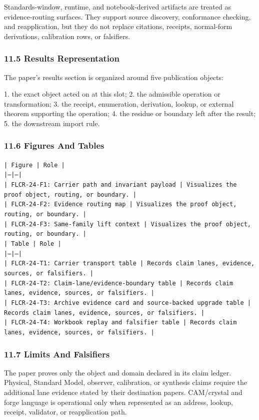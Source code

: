 \documentclass[11pt]{article}
\begin{document}
Standards-window, runtime, and notebook-derived artifacts are treated
as evidence-routing surfaces. They support source discovery, conformance
checking, and reapplication, but they do not replace citations, receipts,
normal-form derivations, calibration rows, or falsifiers.

\subsubsection*{11.5 Results Representation}

The paper's results section is organized around five publication objects:

1. the exact object acted on at this slot;
2. the admissible operation or transformation;
3. the receipt, enumeration, derivation, lookup, or external theorem supporting
   the operation;
4. the residue or boundary left after the result;
5. the downstream import rule.

\subsubsection*{11.6 Figures And Tables}

\noindent\texttt{| Figure | Role |}\\
\noindent\texttt{|---|---|}\\
\noindent\texttt{| FLCR-24-F1: Carrier path and invariant payload | Visualizes the proof object, routing, or boundary. |}\\
\noindent\texttt{| FLCR-24-F2: Evidence routing map | Visualizes the proof object, routing, or boundary. |}\\
\noindent\texttt{| FLCR-24-F3: Same-family lift context | Visualizes the proof object, routing, or boundary. |}\\

\noindent\texttt{| Table | Role |}\\
\noindent\texttt{|---|---|}\\
\noindent\texttt{| FLCR-24-T1: Carrier transport table | Records claim lanes, evidence, sources, or falsifiers. |}\\
\noindent\texttt{| FLCR-24-T2: Claim-lane/evidence-boundary table | Records claim lanes, evidence, sources, or falsifiers. |}\\
\noindent\texttt{| FLCR-24-T3: Archive evidence card and source-backed upgrade table | Records claim lanes, evidence, sources, or falsifiers. |}\\
\noindent\texttt{| FLCR-24-T4: Workbook replay and falsifier table | Records claim lanes, evidence, sources, or falsifiers. |}\\

\subsubsection*{11.7 Limits And Falsifiers}

The paper proves only the object and domain declared in its claim ledger.
Physical, Standard Model, observer, calibration, or synthesis claims require
the additional lane evidence stated by their destination papers. CAM/crystal
and forge language is operational only when represented as an address, lookup,
receipt, validator, or reapplication path.
\end{document}
